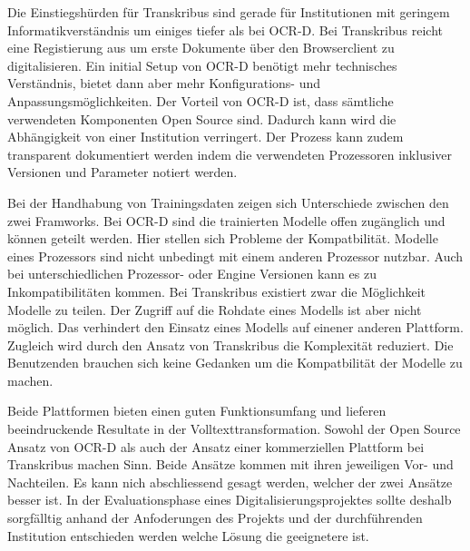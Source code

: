 \documentclass[a4paper,oneside, 12pt]{report}
\begin{document}
Die Einstiegshürden für Transkribus sind gerade für Institutionen mit geringem Informatikverständnis um einiges tiefer als bei OCR-D. Bei Transkribus reicht eine Registierung aus um erste Dokumente über den Browserclient zu digitalisieren. 
Ein initial Setup von OCR-D benötigt mehr technisches Verständnis, bietet dann aber mehr Konfigurations- und Anpassungsmöglichkeiten. Der Vorteil von OCR-D ist, dass sämtliche verwendeten Komponenten Open Source sind. Dadurch kann wird die Abhängigkeit von einer Institution verringert. Der Prozess kann zudem transparent dokumentiert werden indem die verwendeten Prozessoren inklusiver Versionen und Parameter notiert werden. 

Bei der Handhabung von Trainingsdaten zeigen sich Unterschiede zwischen den zwei Framworks. Bei OCR-D sind die trainierten Modelle offen zugänglich und können geteilt werden. Hier stellen sich Probleme der Kompatbilität. Modelle eines Prozessors sind nicht unbedingt mit einem anderen Prozessor nutzbar. Auch bei unterschiedlichen Prozessor- oder Engine Versionen kann es zu Inkompatibilitäten kommen. Bei Transkribus existiert zwar die Möglichkeit Modelle zu teilen. Der Zugriff auf die Rohdate eines Modells ist aber nicht möglich. Das verhindert den Einsatz eines Modells auf einener anderen Plattform. Zugleich wird durch den Ansatz von Transkribus die Komplexität reduziert. Die Benutzenden brauchen sich keine Gedanken um die Kompatbilität der Modelle zu machen.

Beide Plattformen bieten einen guten Funktionsumfang und lieferen beeindruckende Resultate in der Volltexttransformation. Sowohl der Open Source Ansatz von OCR-D als auch der Ansatz einer kommerziellen Plattform bei Transkribus machen Sinn. Beide Ansätze kommen mit ihren jeweiligen Vor- und Nachteilen. Es kann nich abschliessend gesagt werden, welcher der zwei Ansätze besser ist. In der Evaluationsphase eines Digitalisierungsprojektes sollte deshalb sorgfälltig anhand der Anfoderungen des Projekts und der durchführenden Institution entschieden werden welche Lösung die geeignetere ist.


\cleardoublepage
{}
{}
\end{document}
